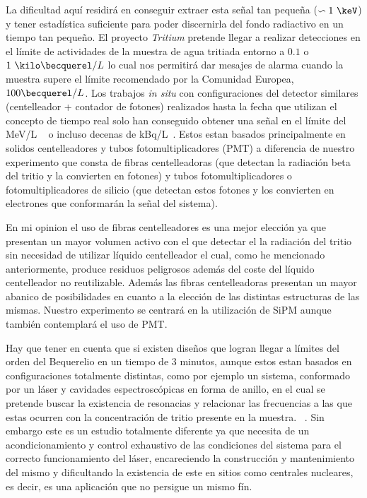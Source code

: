 La dificultad aquí residirá en conseguir extraer esta señal tan pequeña ($\backsim 1~\keV$) y tener estadística suficiente para poder discernirla del fondo radiactivo en un tiempo tan pequeño. El proyecto \textit{Tritium} pretende llegar a realizar detecciones en el límite de actividades de la muestra de agua tritiada entorno a $0.1$ o $1~\kilo\becquerel/L$ lo cual nos permitirá dar mesajes de alarma cuando la muestra supere el límite recomendado por la Comunidad Europea, $100\becquerel/L$. Los trabajos \textit{in situ} con configuraciones del detector similares (centelleador + contador de fotones) realizados hasta la fecha que utilizan el concepto de tiempo real solo han conseguido obtener una señal en el límite del MeV/L ~\cite{TesisTritio} o incluso decenas de kBq/L~\cite{Rat}. Estos estan basados principalmente en solidos centelleadores y tubos fotomultiplicadores (PMT) a diferencia de nuestro experimento que consta de fibras centelleadoras (que detectan la radiación beta del tritio y la convierten en fotones) y tubos fotomultiplicadores o fotomultiplicadores de silicio (que detectan estos fotones y los convierten en electrones que conformarán la señal del sistema). 

En mi opinion el uso de fibras centelleadores es una mejor elección ya que presentan un mayor volumen activo con el que detectar el la radiación del tritio  sin necesidad de utilizar líquido centelleador el cual, como he mencionado anteriormente, produce residuos peligrosos además del coste del líquido centelleador no reutilizable. Además las fibras centelleadoras presentan un mayor abanico de posibilidades en cuanto a la elección de las distintas estructuras de las mismas. Nuestro experimento se centrará en la utilización de SiPM aunque también contemplará el uso de PMT. 

Hay que tener en cuenta que si existen diseños que logran llegar a límites del orden del Bequerelio en un tiempo de 3 minutos, aunque estos estan basados en configuraciones totalmente distintas, como por ejemplo un sistema, conformado por un láser y cavidades espectroscópicas en forma de anillo, en el cual se pretende buscar la existencia de resonacias y relacionar las frecuencias a las que estas ocurren con la concentración de tritio presente en la muestra. ~\cite{Anillo}. Sin embargo este es un estudio totalmente diferente ya que necesita de un acondicionamiento y control exhaustivo de las condiciones del sistema para el correcto funcionamiento del láser, encareciendo la construcción y mantenimiento del mismo y dificultando la existencia de este en sitios como centrales nucleares, es decir, es una aplicación que no persigue un mismo fín. 

